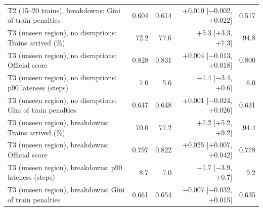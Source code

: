 \begin{tabular}{lrrrr}
T2 (15–20 trains), breakdowns: Gini of train penalties & 0.604 & 0.614 & +0.010 [$-$0.002, +0.022] & 0.517 \\
T3 (unseen region), no disruptions: Trains arrived (\%) & 72.2 & 77.6 & +5.3 [+3.3, +7.3] & 94.8 \\
T3 (unseen region), no disruptions: Official score & 0.828 & 0.831 & +0.004 [$-$0.013, +0.018] & 0.800 \\
T3 (unseen region), no disruptions: p90 lateness (steps) & 7.0 & 5.6 & $-$1.4 [$-$3.4, +0.6] & 6.0 \\
T3 (unseen region), no disruptions: Gini of train penalties & 0.647 & 0.648 & +0.001 [$-$0.024, +0.026] & 0.631 \\
T3 (unseen region), breakdowns: Trains arrived (\%) & 70.0 & 77.2 & +7.2 [+5.2, +9.2] & 94.4 \\
T3 (unseen region), breakdowns: Official score & 0.797 & 0.822 & +0.025 [+0.007, +0.042] & 0.778 \\
T3 (unseen region), breakdowns: p90 lateness (steps) & 8.7 & 7.0 & $-$1.7 [$-$3.9, +0.7] & 9.2 \\
T3 (unseen region), breakdowns: Gini of train penalties & 0.661 & 0.654 & $-$0.007 [$-$0.032, +0.015] & 0.635 \\
\bottomrule
\end{tabular}
